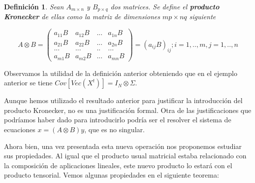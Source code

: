 \documentclass{article}
\theoremstyle{theorem-style}  %
\theoremstyle{definition-style}
\newtheorem{definition}{Definición}[section]
\theoremstyle{example-style}
\theoremstyle{exercise-style}
\begin{document}
	\begin{definition}
		Sean $A_{m \times n}$ y $B_{p \times q}$ dos matrices. Se define el \textbf{producto Kronecker} de ellas como la matriz de dimensiones $mp \times nq$ siguiente
		
		$$A \otimes B =  \left( {\begin{array}{cccc}
			a_{11}B & a_{12}B & ... & a_{1n}B\\
			a_{21}B & a_{22}B & ... & a_{2n}B\\
			... & ... & .. & ... \\
			a_{m1}B & a_{m2}B  & ... & a_{mn}B
			\end{array}}\right) = (a_{ij}B)_{ij} ; i = 1,.., m, j = 1,.., n$$
		
	\end{definition}
	
	Observamos la utilidad de la definición anterior obteniendo que en el ejemplo anterior se tiene $Cov[Vec(X^t)] = I_N \otimes \Sigma$.
	
	Aunque hemos utilizado el resultado anterior para justificar la introducción del producto Kronecker, no es una justificación formal. Otra de las justificaciones que podríamos haber dado para introducirlo podría ser  el resolver el sistema de ecuaciones $x = (A \otimes B)y$, que es no singular. 
	
	Ahora bien, una vez presentada esta nueva operación nos proponemos estudiar sus propiedades. Al igual que el producto usual matricial estaba relacionado con la composición de aplicaciones lineales, este nuevo producto lo estará con el producto tensorial. Vemos algunas propiedades en el siguiente teorema:
	
\end{document}
